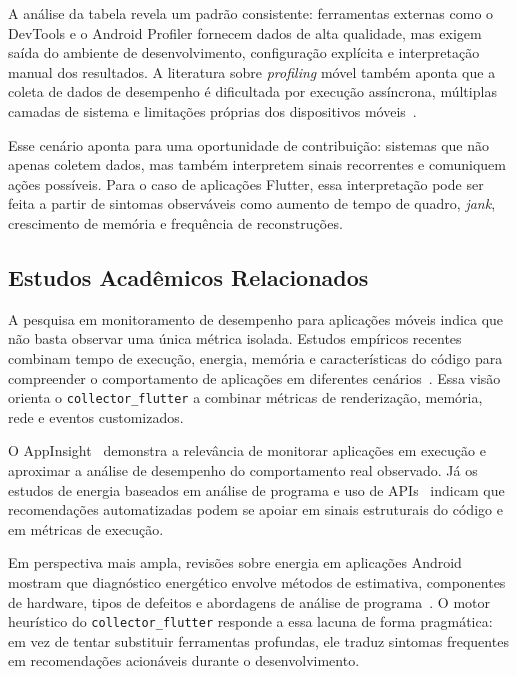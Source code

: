 A análise da tabela revela um padrão consistente: ferramentas externas como o DevTools e o Android Profiler fornecem dados de alta qualidade, mas exigem saída do ambiente de desenvolvimento, configuração explícita e interpretação manual dos resultados. A literatura sobre \textit{profiling} móvel também aponta que a coleta de dados de desempenho é dificultada por execução assíncrona, múltiplas camadas de sistema e limitações próprias dos dispositivos móveis~\cite{ravindranath2012appinsight,hoque2015energy}.

Esse cenário aponta para uma oportunidade de contribuição: sistemas que não apenas coletem dados, mas também interpretem sinais recorrentes e comuniquem ações possíveis. Para o caso de aplicações Flutter, essa interpretação pode ser feita a partir de sintomas observáveis como aumento de tempo de quadro, \textit{jank}, crescimento de memória e frequência de reconstruções.

\subsection*{Estudos Acadêmicos Relacionados}

A pesquisa em monitoramento de desempenho para aplicações móveis indica que não basta observar uma única métrica isolada. Estudos empíricos recentes combinam tempo de execução, energia, memória e características do código para compreender o comportamento de aplicações em diferentes cenários~\cite{rua2024largescale,sun2023energyinefficiency}. Essa visão orienta o \texttt{collector\_flutter} a combinar métricas de renderização, memória, rede e eventos customizados.

O AppInsight~\cite{ravindranath2012appinsight} demonstra a relevância de monitorar aplicações em execução e aproximar a análise de desempenho do comportamento real observado. Já os estudos de energia baseados em análise de programa e uso de APIs~\cite{hao2013estimating,bangash2023apienergy} indicam que recomendações automatizadas podem se apoiar em sinais estruturais do código e em métricas de execução.

Em perspectiva mais ampla, revisões sobre energia em aplicações Android mostram que diagnóstico energético envolve métodos de estimativa, componentes de hardware, tipos de defeitos e abordagens de análise de programa~\cite{sun2023energyinefficiency}. O motor heurístico do \texttt{collector\_flutter} responde a essa lacuna de forma pragmática: em vez de tentar substituir ferramentas profundas, ele traduz sintomas frequentes em recomendações acionáveis durante o desenvolvimento.

